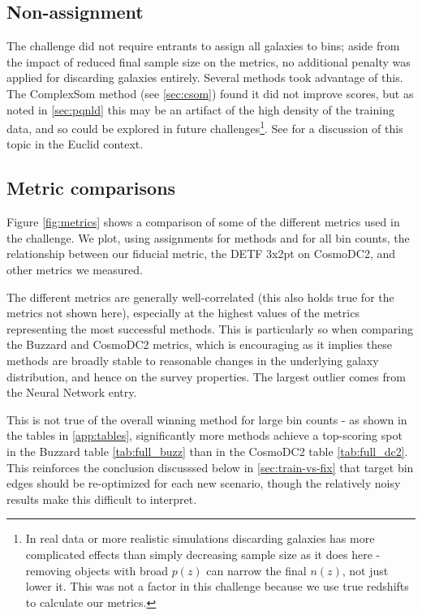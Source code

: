 \documentclass[twocolumn,twocolappendix]{aastex63}
\begin{document}
\subsection{Non-assignment}
The challenge did not require entrants to assign all galaxies to bins; aside from the impact of reduced final sample size on the metrics, no additional penalty was applied for discarding galaxies entirely.  Several methods
took advantage of this.  The ComplexSom method (see \autoref{sec:csom}) found
it did not improve scores, but as noted in \autoref{sec:pqnld} this may be an artifact
of the high density of the training data, and so could be explored in future challenges\footnote{In real data or more realistic simulations discarding galaxies has more complicated effects than simply decreasing sample size as it does here - removing objects with broad $p(z)$ can narrow the final $n(z)$, not just lower it. This was not a factor in this challenge because we use true redshifts to calculate our metrics.}. See \citet{euclid-flagship} for a discussion of this topic in the Euclid context.


\subsection{Metric comparisons} \label{sec:metric-results}
Figure \ref{fig:metrics} shows a comparison of some of the different metrics used in the challenge.
We plot, using assignments for methods and for all bin counts, the relationship between our fiducial
metric, the DETF 3x2pt on CosmoDC2, and other metrics we measured.

The different metrics are generally well-correlated (this also holds true for the metrics not 
shown here), especially at the highest values of the metrics representing the most successful
methods. This is particularly so when comparing the Buzzard and CosmoDC2 metrics, which is encouraging 
as it implies these methods are broadly stable to reasonable changes in the underlying galaxy
distribution, and hence on the survey properties.  The largest outlier comes from the 
{\sc Neural Network} entry.

This is not true of the overall winning method for large bin counts - as shown in the tables
in \autoref{app:tables}, significantly more methods achieve a top-scoring spot in the Buzzard
table \ref{tab:full_buzz} than in the CosmoDC2 table \ref{tab:full_dc2}. This reinforces the
conclusion discusssed below in \autoref{sec:train-vs-fix} that target bin edges should be 
re-optimized for each new scenario, though the relatively noisy
results make this difficult to interpret.
\end{document}
